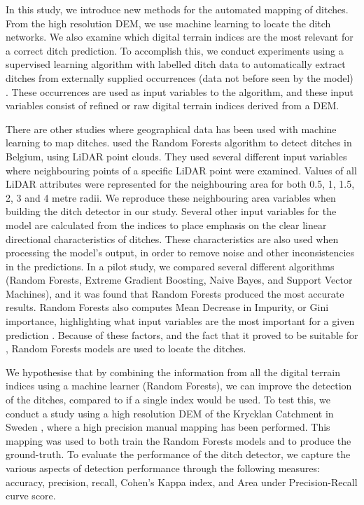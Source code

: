\documentclass[]{interact}
\theoremstyle{plain}%
\theoremstyle{definition}
\theoremstyle{remark}
\begin{document}
In this study, we introduce new methods for the automated mapping of ditches. From the high resolution DEM, we use machine learning to locate the ditch networks. We also examine which digital terrain indices are the most relevant for a correct ditch prediction. To accomplish this, we conduct experiments using a supervised learning algorithm with labelled ditch data to automatically extract ditches from externally supplied occurrences (data not before seen by the model) \citep{kotsiantis}. These occurrences are used as input variables to the algorithm, and these input variables consist of refined or raw digital terrain indices derived from a DEM.

There are other studies where geographical data has been used with machine learning to map ditches. \citet{roelens} used the Random Forests algorithm to detect ditches in Belgium, using LiDAR point clouds. They used several different input variables where neighbouring points of a specific LiDAR point were examined. Values of all LiDAR attributes were represented for the neighbouring area for both 0.5, 1, 1.5, 2, 3 and 4 metre radii. We reproduce these neighbouring area variables when building the ditch detector in our study. Several other input variables for the model are calculated from the indices to place emphasis on the clear linear directional characteristics of ditches. These characteristics are also used when processing the model's output, in order to remove noise and other inconsistencies in the predictions. In a pilot study, we compared several different algorithms (Random Forests, Extreme Gradient Boosting, Naive Bayes, and Support Vector Machines), and it was found that Random Forests produced the most accurate results. Random Forests also computes Mean Decrease in Impurity, or Gini importance, highlighting what input variables are the most important for a given prediction \citep{gini}. Because of these factors, and the fact that it proved to be suitable for \citet{roelens}, Random Forests models are used to locate the ditches.

We hypothesise that by combining the information from all the digital terrain indices using a machine learner (Random Forests), we can improve the detection of the ditches, compared to if a single index would be used. To test this, we conduct a study using a high resolution DEM of the Krycklan Catchment in Sweden \citep{krycklancatchment}, where a high precision manual mapping has been performed. This mapping was used to both train the Random Forests models and to produce the ground-truth. To evaluate the performance of the ditch detector, we capture the various aspects of detection performance through the following measures: accuracy, precision, recall, Cohen’s Kappa index, and Area under Precision-Recall curve score.
\end{document}
